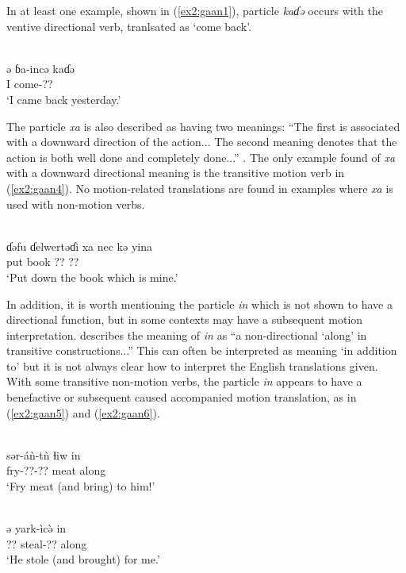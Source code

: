 In at least one example, shown in (\ref{ex2:gaan1}), particle \textit{kaɗə} occurs with the ventive directional verb, tranlsated as `come back'.

\ea\label{ex2:gaan1}
 \\
\gll  ə ɓa-incə kaɗə	\\
I come-?? 	\\
\glt `I came back yesterday.'
\z 

The particle \textit{xa} is also described as having two meanings: ``The first is associated with a downward direction of the action... The second meaning denotes that the action is both well done and completely done...'' \citep[186]{newmanCaseGrammarGa1971}. The only example found of \textit{xa} with a downward directional meaning is the transitive motion verb in (\ref{ex2:gaan4}). No motion-related translations are found in examples where \textit{xa} is used with non-motion verbs. 

\ea\label{ex2:gaan4}
 \\
\gll  ɗəfu ɗelwertəɗi xa nec kə yina	\\
put book   ?? ?? 		\\
\glt `Put down the book which is mine.'
\z 

In addition, it is worth mentioning the particle \textit{in} which is not shown to have a directional function, but in some contexts may have a subsequent motion interpretation. \citet{newmanCaseGrammarGa1971} describes the meaning of \textit{in} as ``a non-directional `along' in transitive constructions...'' This can often be interpreted as meaning `in addition to' but it is not always clear how to interpret the English translations given. With some transitive non-motion verbs, the particle \textit{in} appears to have a benefactive or subsequent caused accompanied motion translation, as in (\ref{ex2:gaan5}) and (\ref{ex2:gaan6}). 

\ea\label{ex2:gaan5}
 \\
\gll sər-áǹ-tǹ ɬiw in	\\
fry-??-?? meat along \\
\glt `Fry meat (and bring) to him!'

\ex\label{ex2:gaan6}
 \\
\gll  ə yark-ìcə̀ in	\\
?? steal-?? along		\\
\glt `He stole (and brought) for me.'
\z

